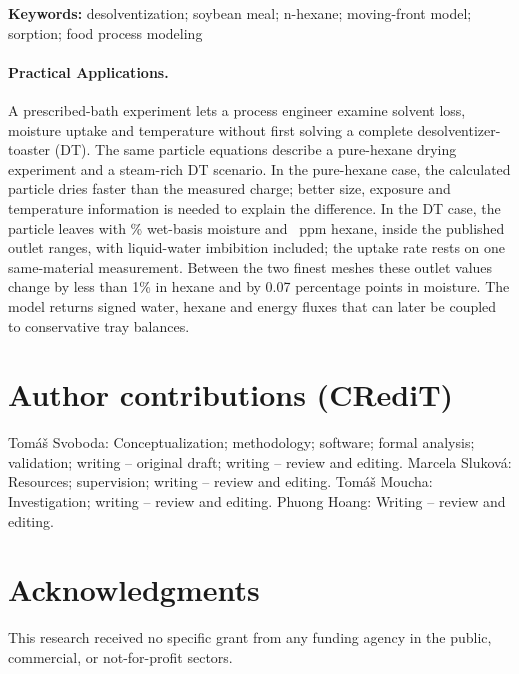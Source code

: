 \documentclass[11pt]{article}
\begin{document}
\noindent\textbf{Keywords:} desolventization; soybean meal; n-hexane;
moving-front model; sorption; food process modeling

\paragraph*{Practical Applications.}
A prescribed-bath experiment lets a process engineer examine solvent
loss, moisture uptake and temperature without first solving a complete
desolventizer-toaster (DT). The same particle equations describe a
pure-hexane drying experiment and a steam-rich DT scenario. In the
pure-hexane case, the calculated particle dries faster than the measured
charge; better size, exposure and temperature information is needed to
explain the difference. In the DT case, the particle leaves with \DTFiniteMoisture\%
wet-basis moisture and \DTFiniteHexaneWet\ ppm hexane, inside the published
outlet ranges, with liquid-water imbibition included; the uptake rate
rests on one same-material measurement. Between the two finest meshes
these outlet values change by less than 1\% in hexane and by 0.07
percentage points in moisture. The model returns signed water,
hexane and energy fluxes that can later be coupled to conservative tray
balances.








\section*{Author contributions (CRediT)}
Tom\'a\v{s} Svoboda: Conceptualization; methodology; software; formal
analysis; validation; writing -- original draft; writing -- review and
editing. Marcela Slukov\'a: Resources; supervision;
writing -- review and editing. Tom\'a\v{s} Moucha: Investigation;
writing -- review and editing. Phuong Hoang: Writing -- review and editing.

\section*{Acknowledgments}
This research received no specific grant from any funding agency in the
public, commercial, or not-for-profit sectors.
\end{document}
